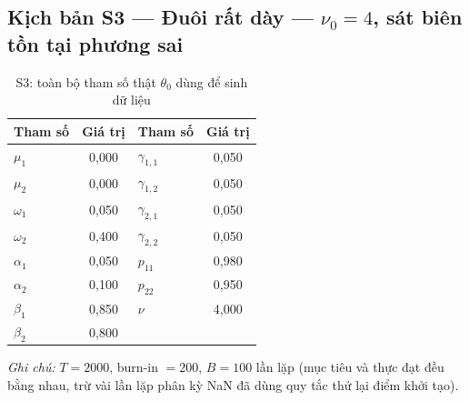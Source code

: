 \documentclass[11pt,a4paper]{article}
\begin{document}
\subsection*{Kịch bản S3 --- Đuôi rất dày --- $\nu_0=4$, sát biên tồn tại phương sai}
\begin{table}[H]\centering\normalsize
\caption{S3: toàn bộ tham số thật $\theta_0$ dùng để sinh dữ liệu}
\begin{tabularx}{\textwidth}{l C  l C}
\toprule
\textbf{Tham số} & \textbf{Giá trị} & \textbf{Tham số} & \textbf{Giá trị} \\
\midrule
$\mu_1$ & 0,000 & $\gamma_{1,1}$ & 0,050 \\
$\mu_2$ & 0,000 & $\gamma_{1,2}$ & 0,050 \\
$\omega_1$ & 0,050 & $\gamma_{2,1}$ & 0,050 \\
$\omega_2$ & 0,400 & $\gamma_{2,2}$ & 0,050 \\
$\alpha_1$ & 0,050 & $p_{11}$ & 0,980 \\
$\alpha_2$ & 0,100 & $p_{22}$ & 0,950 \\
$\beta_1$ & 0,850 & $\nu$ & 4,000 \\
$\beta_2$ & 0,800 &  &  \\
\bottomrule
\end{tabularx}
\vspace{0.2em}\raggedright\scriptsize \emph{Ghi chú:} $T=2000$, burn-in $=200$, $B=100$ lần lặp (mục tiêu và thực đạt đều bằng nhau, trừ vài lần lặp phân kỳ NaN đã dùng quy tắc thử lại điểm khởi tạo).
\end{table}
\end{document}
